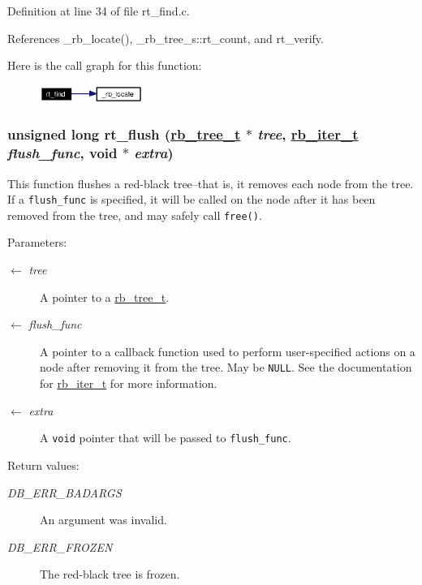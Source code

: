 Definition at line 34 of file rt\_\-find.c.

References \_\-rb\_\-locate(), \_\-rb\_\-tree\_\-s::rt\_\-count, and rt\_\-verify.

Here is the call graph for this function:\begin{figure}[H]
\begin{center}
\leavevmode
\includegraphics[width=95pt]{group__dbprim__rbtree_ga10_cgraph}
\end{center}
\end{figure}
\hypertarget{group__dbprim__rbtree_ga13}{
\subsubsection[rt\_\-flush]{\setlength{\rightskip}{0pt plus 5cm}unsigned long rt\_\-flush (\hyperlink{struct__rb__tree__s}{rb\_\-tree\_\-t} $\ast$ {\em tree}, \hyperlink{group__dbprim__rbtree_ga2}{rb\_\-iter\_\-t} {\em flush\_\-func}, void $\ast$ {\em extra})}}
\label{group__dbprim__rbtree_ga13}


This function flushes a red-black tree--that is, it removes each node from the tree. If a {\tt flush\_\-func} is specified, it will be called on the node after it has been removed from the tree, and may safely call {\tt free()}.

\begin{Desc}
\item[Parameters:]
\begin{description}
\item[\mbox{$\leftarrow$} {\em tree}]A pointer to a \hyperlink{group__dbprim__rbtree_ga0}{rb\_\-tree\_\-t}. \item[\mbox{$\leftarrow$} {\em flush\_\-func}]A pointer to a callback function used to perform user-specified actions on a node after removing it from the tree. May be {\tt NULL}. See the documentation for \hyperlink{group__dbprim__rbtree_ga2}{rb\_\-iter\_\-t} for more information. \item[\mbox{$\leftarrow$} {\em extra}]A {\tt void} pointer that will be passed to {\tt flush\_\-func}.\end{description}
\end{Desc}
\begin{Desc}
\item[Return values:]
\begin{description}
\item[{\em DB\_\-ERR\_\-BADARGS}]An argument was invalid. \item[{\em DB\_\-ERR\_\-FROZEN}]The red-black tree is frozen.\end{description}
\end{Desc}


